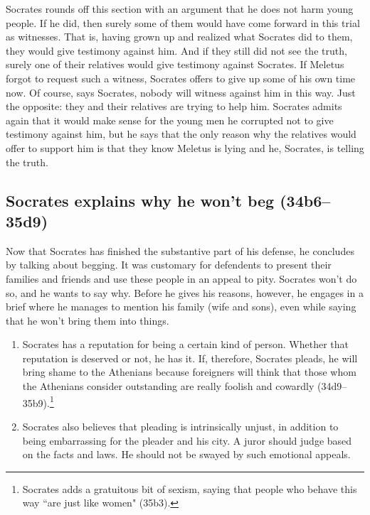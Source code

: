 \documentclass[11pt]{article}
\begin{document}
Socrates rounds off this section with an argument that he does not harm young people.  If he did, then surely some of them would have come forward in this trial as witnesses.  That is, having grown up and realized what Socrates did to them, they would give testimony against him.  And if they still did not see the truth, surely one of their relatives would give testimony against Socrates.  If Meletus forgot to request such a witness, Socrates offers to give up some of his own time now.  Of course, says Socrates, nobody will witness against him in this way.  Just the opposite: they and their relatives are trying to help him.  Socrates admits again that it would make sense for the young men he corrupted not to give testimony against him, but he says that the only reason why the relatives would offer to support him is that they know Meletus is lying and he, Socrates, is telling the truth.

\subsection{Socrates explains why he won't beg (34b6--35d9)}

Now that Socrates has finished the substantive part of his defense, he concludes by talking about begging.  It was customary for defendents to present their families and friends and use these people in an appeal to pity.  Socrates won't do so, and he wants to say why.  Before he gives his reasons, however, he engages in a brief  where he manages to mention his family (wife and sons), even while saying that he won't bring them into things.

\begin{enumerate}
    \item Socrates has a reputation for being a certain kind of person.  Whether that reputation is deserved or not, he has it. If, therefore, Socrates pleads, he will bring shame to the Athenians because foreigners will think that those whom the Athenians consider outstanding are really foolish and cowardly (34d9--35b9).\footnote{Socrates adds a gratuitous bit of sexism, saying that people who behave this way ``are just like women" (35b3).}
    \item Socrates also believes that pleading is intrinsically unjust, in addition to being embarrassing for the pleader and his city.  A juror should judge based on the facts and laws.  He should not be swayed by such emotional appeals.
\end{enumerate}
\end{document}
